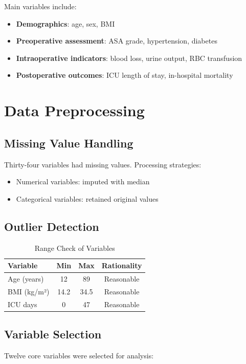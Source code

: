 \documentclass[12pt,a4paper]{article}
\begin{document}
Main variables include:
\begin{itemize}
    \item \textbf{Demographics}: age, sex, BMI
    \item \textbf{Preoperative assessment}: ASA grade, hypertension, diabetes
    \item \textbf{Intraoperative indicators}: blood loss, urine output, RBC transfusion
    \item \textbf{Postoperative outcomes}: ICU length of stay, in-hospital mortality
\end{itemize}

\section{Data Preprocessing}

\subsection{Missing Value Handling}
Thirty-four variables had missing values. Processing strategies:
\begin{itemize}
    \item Numerical variables: imputed with median
    \item Categorical variables: retained original values
\end{itemize}

\subsection{Outlier Detection}
\begin{table}[H]
\centering
\caption{Range Check of Variables}
\begin{tabular}{lccc}
\toprule
\textbf{Variable} & \textbf{Min} & \textbf{Max} & \textbf{Rationality} \\
\midrule
Age (years) & 12 & 89 & Reasonable \\
BMI (kg/m²) & 14.2 & 34.5 & Reasonable \\
ICU days & 0 & 47 & Reasonable \\
\bottomrule
\end{tabular}
\end{table}

\subsection{Variable Selection}
Twelve core variables were selected for analysis:
\end{document}
